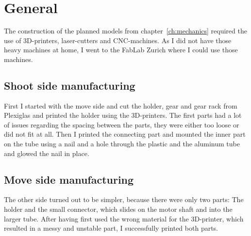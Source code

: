 \section{General}\label{sec:general3}
The construction of the planned models from chapter~\ref{ch:mechanics} required the use of 3D-printers, laser-cutters and CNC-machines.
As I did not have those heavy machines at home, I went to the FabLab Zurich\autocite{fablab} where I could use those machines.

\subsection{Shoot side manufacturing}\label{subsec:turn-side-manufacturing}
First I started with the move side and cut the holder, gear and gear rack from Plexiglas and printed the holder using the 3D-printers.
The first parts had a lot of issues regarding the spacing between the parts, they were either too loose or did not fit at all.
Then I printed the connecting part and mounted the inner part on the tube using a nail and a hole through the plastic and the aluminum tube and glowed the nail in place.

\subsection{Move side manufacturing}\label{subsec:move-side-manufacturing}
The other side turned out to be simpler, because there were only two parts: The holder and the small connector, which slides on the motor shaft and into the larger tube.
After having first used the wrong material for the 3D-printer, which resulted in a messy and unstable part, I successfully printed both parts.

